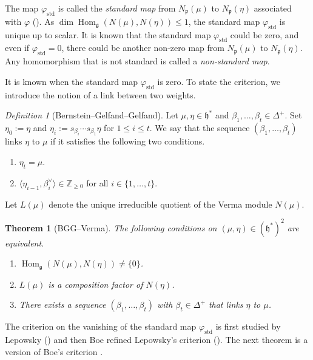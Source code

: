 \documentclass[reqno,11pt]{amsart}
\newtheorem{thm}[equation]{Theorem}
\theoremstyle{remark}
\newtheorem{defn}[equation]{Definition}
\numberwithin{equation}{section}
\newcommand{\gD}{\Delta}
\newcommand{\fg}{{\mathfrak g}}
\newcommand{\fh}{{\mathfrak h}}
\newcommand{\fp}{{\mathfrak p}}
\newcommand{\Z}{\mathbb{Z}}
\newcommand{\Hom}{\operatorname{Hom}}
\newcommand{\IP}[2]{\langle#1 , #2\rangle}     %
\newcommand{\std}{\mathrm{std}}
\begin{document}
The map $\varphi_{\std}$ is called the \emph{standard map} from $N_\fp(\mu)$ to 
$N_\fp(\eta)$ associated with $\varphi$ (\cite[p.\ 501]{Lepowsky77}). As $\dim \Hom_{\fg}(N(\mu), N(\eta)) \leq 1$, 
the standard map $\varphi_{\std}$ is unique up to scalar. 
It is known that the standard map $\varphi_{\std}$ could be zero, and even if 
$\varphi_{\std}=0$, there could be another non-zero map from $N_\fp(\mu)$ to 
$N_\fp(\eta)$. Any homomorphism that is not standard is called 
a \emph{non-standard map}.

It is known when the standard map $\varphi_\std$ is zero.
To state the criterion, we introduce the notion of a link between two weights.

\begin{defn}[{Bernstein--Gelfand--Gelfand}]\label{def:link}
Let $\mu, \eta \in \fh^*$ and $\beta_1,\ldots, \beta_t \in \gD^+$. Set
$\eta_0 := \eta$ and $\eta_i := s_{\beta_i}\cdots s_{\beta_1}\eta$ for $1\leq i \leq t$.
We say that the sequence $(\beta_1,\ldots, \beta_t)$ links $\eta$ to $\mu$ if 
it satisfies the following two conditions.
\begin{enumerate}[(1)]
\item $\eta_t = \mu$.
\vskip 0.05in
\item $\IP{\eta_{i-1}}{\beta^\vee_{i}} \in \Z_{\geq 0}$ 
for all $i \in \{1,\ldots, t\}$.
\end{enumerate} 
\end{defn}

Let $L(\mu)$ denote the unique irreducible quotient of the Verma module
$N(\mu)$.

\begin{thm}[{BGG--Verma}]\label{thm:link}
The following conditions on $(\mu, \eta) \in (\fh^*)^2$ are equivalent.

\begin{enumerate}
\item[\emph{(i)}] $\Hom_\fg(N(\mu), N(\eta)) \neq \{0\}$.
\item[\emph{(ii)}] $L(\mu)$ is a composition factor of $N(\eta)$.
\item[\emph{(iii)}] There exists a sequence $(\beta_1, \ldots, \beta_t)$ with 
$\beta_t \in \gD^+$ that links $\eta$ to $\mu$.
\end{enumerate}
\end{thm}

The criterion on the vanishing of the standard map $\varphi_{\std}$ is first
studied by Lepowsky (\cite{Lepowsky77}) and then Boe refined Lepowsky's 
criterion (\cite{Boe85}). 
The next theorem is a version of Boe's criterion
\cite[Thm.\ 3.3]{Boe85}.
\end{document}
